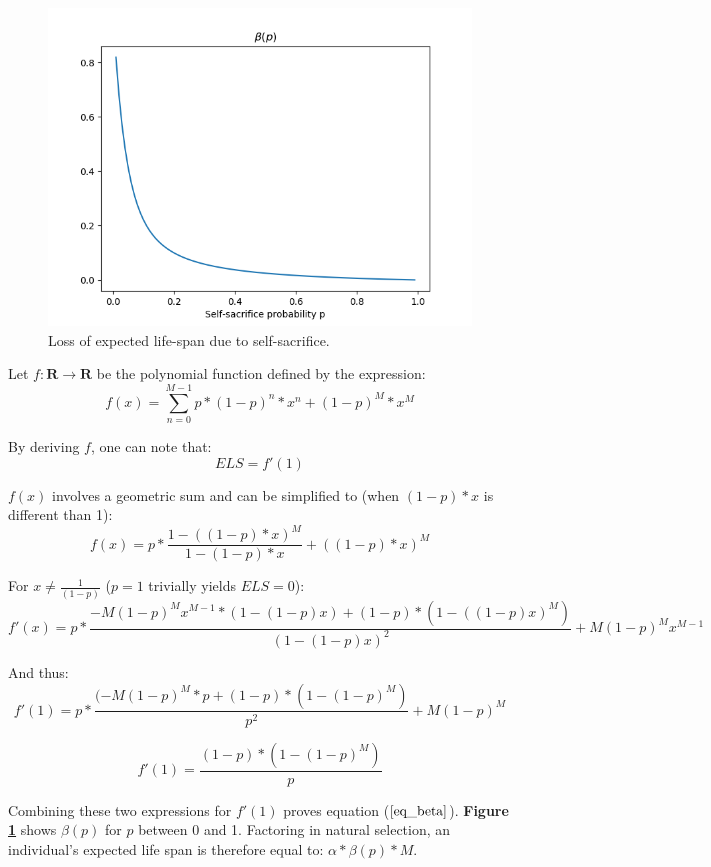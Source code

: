 \documentclass[a4paper,12pt]{report}
\begin{document}
 \begin{figure}[h]
    \centering
    \includegraphics[width=1\textwidth]{Beta}
    \caption{Loss of expected life-span due to self-sacrifice.}
    \label{fig:beta}
\end{figure}

Let $f \colon \mathbf{R} \to \mathbf{R}$ be the polynomial function defined by the expression:
\[ f(x) = \sum_{n=0}^{M-1} p*(1-p)^n*x^n + (1-p)^M*x^M \]

By deriving $f$, one can note that:
\begin{equation}
    ELS = f'(1)
\label{eq_ELS_f}
\end{equation}

$f(x)$ involves a geometric sum and can be simplified to (when $(1-p)*x$ is different than 1):
\[ f(x) = p* \frac{1 - ((1-p)*x)^M}{1-(1-p)*x} + ((1-p)*x)^M \]

For $x\neq\frac{1}{(1-p)}$ ($p=1$ trivially yields $ELS=0$):
\[ f'(x) = p * \frac{-M(1-p)^Mx^{M-1}*(1-(1-p)x) + (1-p)*(1-((1-p)x)^M)}{(1-(1-p)x)^2} + M(1-p)^Mx^{M-1} \]

And thus:
\[f'(1) = p * \frac{(-M(1-p)^M*p + (1-p)*(1-(1-p)^M)}{p^2} + M(1-p)^M \]

\begin{equation}
    f'(1) = \frac{(1-p)*(1-(1-p)^M)}{p}
\label{eq_f'}
\end{equation}

Combining these two expressions for $f'(1)$ proves equation ($\bf\ref{eq_beta}$). \textbf{Figure \ref{fig:beta}} shows
$\beta(p)$ for $p$ between 0 and 1. Factoring in natural selection, an individual's expected life span is therefore equal to: $\alpha*\beta(p)*M$.
\end{document}
